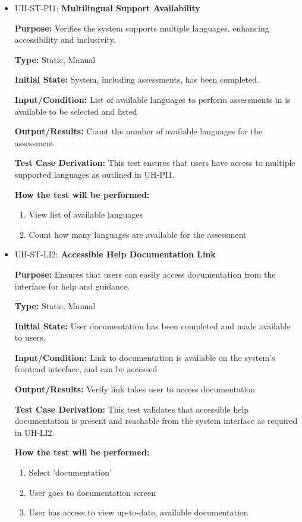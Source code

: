 \documentclass[12pt, titlepage]{article}
\begin{document}
\begin{itemize}
  \item UH-ST-PI1: \textbf{Multilingual Support Availability}
  \begin{mdframed}[linewidth=0.5mm]
      \textbf{Purpose:} Verifies the system supports multiple languages, enhancing accessibility and inclusivity. \par
      \textbf{Type:} Static, Manual \par
      \textbf{Initial State:} System, including assessments, has been completed. \par
      \textbf{Input/Condition:} List of available languages to perform assessments in is available to be selected and listed \par
      \textbf{Output/Results:} Count the number of available languages for the assessment \par
      \textbf{Test Case Derivation:} This test ensures that users have access to multiple supported languages as outlined in UH-PI1. \par
      \textbf{How the test will be performed:}
      \begin{enumerate}[noitemsep]
        \item View list of available languages
        \item Count how many languages are available for the assessment
      \end{enumerate}
  \end{mdframed}

  \item UH-ST-LI2: \textbf{Accessible Help Documentation Link}
  \begin{mdframed}[linewidth=0.5mm]
      \textbf{Purpose:} Ensures that users can easily access documentation from the interface for help and guidance. \par
      \textbf{Type:} Static, Manual \par
      \textbf{Initial State:} User documentation has been completed and made available to users. \par
      \textbf{Input/Condition:} Link to documentation is available on the system's frontend interface, and can be accessed \par
      \textbf{Output/Results:} Verify link takes user to access documentation \par
      \textbf{Test Case Derivation:} This test validates that accessible help documentation is present and reachable from the system interface as required in UH-LI2. \par
      \textbf{How the test will be performed:}
      \begin{enumerate}[noitemsep]
        \item Select 'documentation'
        \item User goes to documentation screen
        \item User has access to view up-to-date, available documentation
      \end{enumerate}
  \end{mdframed}
\end{itemize}
\end{document}
